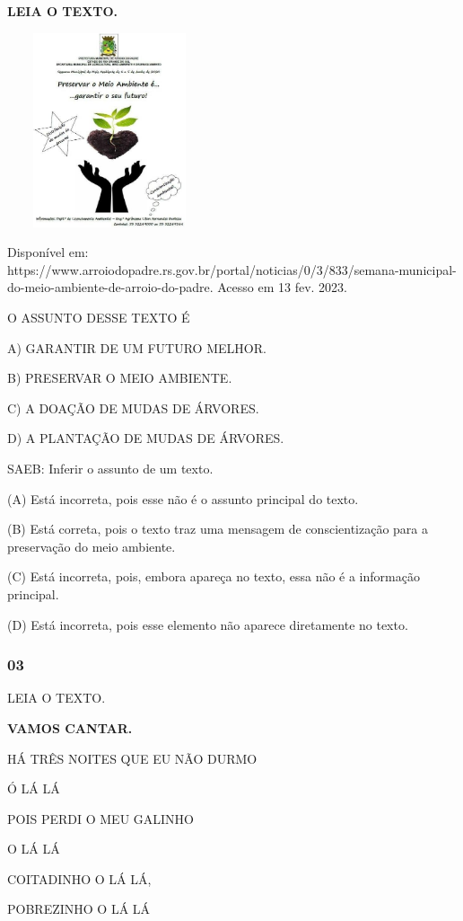 \textbf{LEIA O TEXTO.}

\includegraphics[width=2.37500in,height=2.25000in]{media/image166.jpg}

Disponível em: https://www.arroiodopadre.rs.gov.br/portal/noticias/0/3/833/semana-municipal-do-meio-ambiente-de-arroio-do-padre. Acesso em 13 fev. 2023.

O ASSUNTO DESSE TEXTO É

A) GARANTIR DE UM FUTURO MELHOR.

B) PRESERVAR O MEIO AMBIENTE.

C) A DOAÇÃO DE MUDAS DE ÁRVORES.

D) A PLANTAÇÃO DE MUDAS DE ÁRVORES.

\protect\hypertarget{_heading=h.qsh70q}{}{}SAEB: Inferir o
assunto de um texto.

(A) Está incorreta, pois esse não é o assunto principal do texto.

(B) Está correta, pois o texto traz uma mensagem de conscientização para
a preservação do meio ambiente.

(C) Está incorreta, pois, embora apareça no texto, essa não é a informação principal.

(D) Está incorreta, pois esse elemento não aparece diretamente no texto.

\subsubsection{03 }\label{section-18}

LEIA O TEXTO.

\textbf{VAMOS CANTAR.}

HÁ TRÊS NOITES QUE EU NÃO DURMO

Ó LÁ LÁ

POIS PERDI O MEU GALINHO

O LÁ LÁ

COITADINHO O LÁ LÁ,

POBREZINHO O LÁ LÁ

